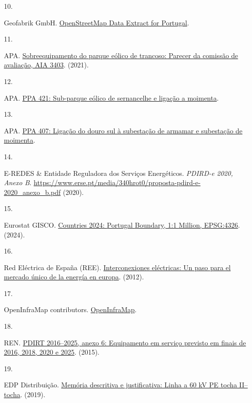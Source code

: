 \documentclass[
  10pt]{article}
\newlength{\cslhangindent}
\newlength{\csllabelwidth}
\newenvironment{CSLReferences}[2] %
 {\begin{list}{}{%
  \setlength{\itemindent}{0pt}
  \setlength{\leftmargin}{0pt}
  \setlength{\parsep}{0pt}
  \ifodd #1
   \setlength{\leftmargin}{\cslhangindent}
   \setlength{\itemindent}{-1\cslhangindent}
  \fi
  \setlength{\itemsep}{#2\baselineskip}}}
 {\end{list}}
\newcommand{\CSLLeftMargin}[1]{\parbox[t]{\csllabelwidth}{\strut#1\strut}}
\newcommand{\CSLRightInline}[1]{\parbox[t]{\linewidth - \csllabelwidth}{\strut#1\strut}}
\begin{document}
\begin{CSLReferences}{0}{0}
\CSLLeftMargin{10. }%
\CSLRightInline{Geofabrik GmbH.
\href{https://download.geofabrik.de/europe/portugal.html}{OpenStreetMap
{Data} {Extract} for {Portugal}}.}

\CSLLeftMargin{11. }%
\CSLRightInline{APA.
\href{https://siaia.apambiente.pt/AIADOC/AIA3403/parecerca_3403202192134944.pdf}{Sobreequipamento
do parque eólico de trancoso: Parecer da comissão de avaliação, AIA
3403}. (2021).}

\CSLLeftMargin{12. }%
\CSLRightInline{APA.
\href{https://siaia.apambiente.pt/PosAvaliacao/DetalhesPosAvaliacao/421}{PPA
421: Sub-parque eólico de sernancelhe e ligação a moimenta}.}

\CSLLeftMargin{13. }%
\CSLRightInline{APA.
\href{https://siaia.apambiente.pt/PosAvaliacao/DetalhesPosAvaliacao/407}{PPA
407: Ligação do douro sul à subestação de armamar e subestação de
moimenta}.}

\CSLLeftMargin{14. }%
\CSLRightInline{E-REDES \& Entidade Reguladora dos Serviços Energéticos.
\emph{PDIRD-e 2020, {Anexo} {B}}.
\url{https://www.erse.pt/media/340hrot0/proposta-pdird-e-2020_anexo_b.pdf}
(2020).}

\CSLLeftMargin{15. }%
\CSLRightInline{Eurostat GISCO.
\href{https://gisco-services.ec.europa.eu/distribution/v2/countries/}{Countries
2024: {Portugal} {Boundary,} 1:1 {Million,} {EPSG:4326}}. (2024).}

\CSLLeftMargin{16. }%
\CSLRightInline{Red Eléctrica de España (REE).
\href{https://www.ree.es/sites/default/files/jgk4byy3ukct.pdf}{Interconexiones
eléctricas: Un paso para el mercado único de la energía en europa}.
(2012).}

\CSLLeftMargin{17. }%
\CSLRightInline{OpenInfraMap contributors.
\href{https://openinframap.org/about}{OpenInfraMap}.}

\CSLLeftMargin{18. }%
\CSLRightInline{REN.
\href{https://www.erse.pt/media/b1edmm30/proposta_pdirt_e_2015_anexos.pdf}{PDIRT
2016--2025, anexo 6: Equipamento em serviço previsto em finais de 2016,
2018, 2020 e 2025}. (2015).}

\CSLLeftMargin{19. }%
\CSLRightInline{EDP Distribuição.
\href{https://siaia.apambiente.pt/AIADOC/AIA3274/projeto\%20linha\%20eletrica\%20pe\%20tocha\%20ii2019729153214.pdf}{Memória
descritiva e justificativa: Linha a 60 kV PE tocha II--tocha}. (2019).}


\end{CSLReferences}
\end{document}

